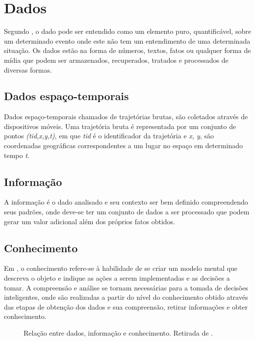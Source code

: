 \documentclass[	12pt, Times, openright, twoside, a4paper, english, brazil]{abntex2}
\begin{document}
\section{Dados}
Segundo \cite{Rezende2003}, o dado pode ser entendido como um elemento puro, quantificável, sobre um determinado evento onde este não tem um entendimento de uma determinada situação. Os dados estão na forma de números, textos, fatos ou qualquer forma de mídia que podem ser armazenados, recuperados, tratados e processados de diversas formas.

\subsection{Dados espaço-temporais}
Dados espaço-temporais chamados de trajetórias brutas, são coletados através de dispositivos móveis. Uma trajetória bruta é representada por um conjunto de pontos \textit{(tid,x,y,t)}, em que \textit{tid} é o identificador da trajetória e \textit{x, y}, são coordenadas geográficas correspondentes a um lugar no espaço em determinado tempo \textit{t}.

\subsection{Informação}
A informação é o dado analisado e seu contexto ser bem definido compreendendo seus padrões, onde deve-se ter um conjunto de dados a ser processado que podem gerar um valor adicional além dos próprios fatos obtidos.

\subsection{Conhecimento}
Em \cite{Rezende2003}, o conhecimento refere-se à habilidade de se criar um modelo mental que descreva o objeto e indique as ações a serem implementadas e as decisões a tomar. A compreensão e análise se tornam necessárias para a tomada de decisões inteligentes, onde são realizadas a partir do nível do conhecimento obtido através das etapas de obtenção dos dados e sua compreensão, retirar informações e obter conhecimento.\\

\begin{figure}[htb]
\caption{Relação entre dados, informação e conhecimento. Retirada de \cite{Rezende2003}.\label{fig:relação}}
\end{figure}
\end{document}
